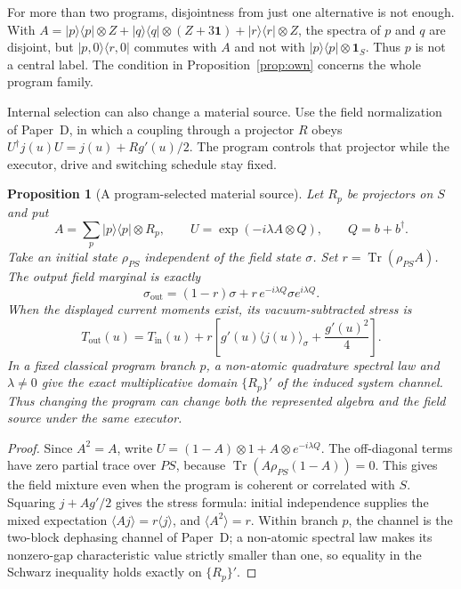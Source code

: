 \documentclass[12pt,a4paper]{article}
\newtheorem{proposition}[theorem]{Proposition}
\newcommand{\ket}[1]{|#1\rangle}
\newcommand{\bra}[1]{\langle #1|}
\newcommand{\proj}[1]{|#1\rangle\!\langle #1|}
\newcommand{\Tr}{\operatorname{Tr}}
\begin{document}
For more than two programs, disjointness from just one alternative is not enough. With $A=\proj p\otimes Z+\proj q\otimes(Z+3\mathbf 1)+\proj r\otimes Z$, the spectra of $p$ and $q$ are disjoint, but $\ket{p,0}\bra{r,0}$ commutes with $A$ and not with $\proj p\otimes\mathbf 1_S$. Thus $p$ is not a central label. The condition in Proposition~\ref{prop:own} concerns the whole program family.

Internal selection can also change a material source. Use the field normalization of Paper~D, in which a coupling through a projector $R$ obeys $U^\dagger j(u)U=j(u)+R g'(u)/2$. The program controls that projector while the executor, drive and switching schedule stay fixed.

\begin{proposition}[A program-selected material source]
\label{prop:programsource}
Let $R_p$ be projectors on $S$ and put
\[
 A=\sum_p\proj p\otimes R_p,\qquad
 U=\exp(-i\lambda A\otimes Q),\qquad Q=b+b^\dagger.
\]
Take an initial state $\rho_{PS}$ independent of the field state $\sigma$. Set $r=\Tr(\rho_{PS}A)$. The output field marginal is exactly
\[
 \sigma_{\mathrm{out}}=(1-r)\sigma+
 r\,e^{-i\lambda Q}\sigma e^{i\lambda Q}.
\]
When the displayed current moments exist, its vacuum-subtracted stress is
\[
 T_{\mathrm{out}}(u)=T_{\mathrm{in}}(u)+
 r\left[g'(u)\langle j(u)\rangle_\sigma+
                  \frac{g'(u)^2}{4}\right].
\]
In a fixed classical program branch $p$, a non-atomic quadrature spectral law and $\lambda\ne0$ give the exact multiplicative domain $\{R_p\}'$ of the induced system channel. Thus changing the program can change both the represented algebra and the field source under the same executor.
\end{proposition}

\begin{proof}
Since $A^2=A$, write $U=(1-A)\otimes1+A\otimes e^{-i\lambda Q}$. The off-diagonal terms have zero partial trace over $PS$, because $\Tr(A\rho_{PS}(1-A))=0$. This gives the field mixture even when the program is coherent or correlated with $S$. Squaring $j+A g'/2$ gives the stress formula: initial independence supplies the mixed expectation $\langle A j\rangle=r\langle j\rangle$, and $\langle A^2\rangle=r$. Within branch $p$, the channel is the two-block dephasing channel of Paper~D; a non-atomic spectral law makes its nonzero-gap characteristic value strictly smaller than one, so equality in the Schwarz inequality holds exactly on $\{R_p\}'$.
\end{proof}
\end{document}

